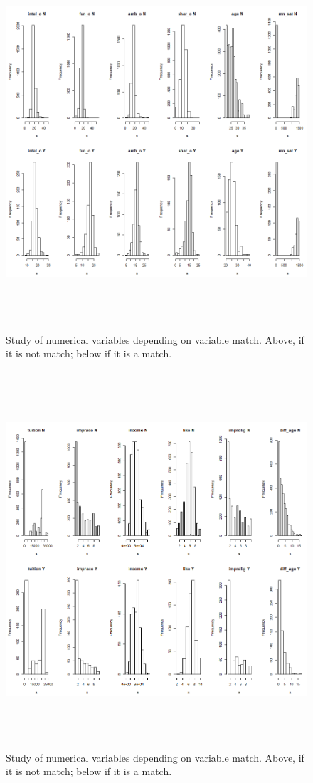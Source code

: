 \begin{figure}
  \centering
  \includegraphics[width= 16cm, height=14cm]{images/profiling/CPG_match_numerical_intelo_mnsat.png}
  \caption{Study of numerical variables depending on variable match. Above, if it is not match; below if it is a match.}
  \label{fig:indiv}
\end{figure}

\begin{figure}
  \centering
  \includegraphics[width= 16cm, height=14cm]{images/profiling/CPG_match_numerical_tuition_diffage.png}
  \caption{Study of numerical variables depending on variable match. Above, if it is not match; below if it is a match.}
  \label{fig:indiv}
\end{figure}

